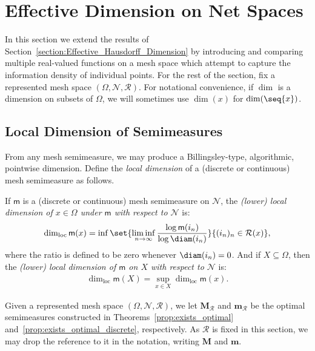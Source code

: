 
\section{Effective Dimension on Net Spaces}
\label{section:Effective_Dimension_on_Net_Spaces}

In this section we extend the results of Section~\ref{section:Effective_Hausdorff_Dimension} by introducing and comparing multiple real-valued functions on a mesh space which attempt to capture the information density of individual points. For the rest of the section, fix a represented mesh space $(\Omega, \mathcal{N}, \mathscr{R})$. For notational convenience, if $\dim$ is a dimension on subsets of $\Omega$, we will sometimes use $\dim(x)$ for $\dim(\seq{x})$. 

\subsection{Local Dimension of Semimeasures}

From any mesh semimeasure, we may produce a Billingsley-type, algorithmic, pointwise dimension. Define the \textit{local dimension} of a (discrete or continuous) mesh semimeasure as follows.

\begin{definition}
    If $\mathsf{m}$ is a (discrete or continuous) mesh semimeasure on $\mathcal{N}$, the \textit{(lower) local dimension of $x \in \Omega$ under $\mathsf{m}$ with respect to $\mathcal{N}$} is:
    \begin{align*}
        \dim_{\operatorname{loc}} \mathsf{m}(x) = \inf \set{\liminf_{n \to \infty} \frac{\log \mathsf{m}(i_n)}{\log \diam(i_n)}}{(i_n)_n \in \mathcal{R}(x)},
    \end{align*}
    where the ratio is defined to be zero whenever $\diam(i_n) = 0$. And if $X \subseteq \Omega$, then the \textit{(lower) local dimension of $\mathsf{m}$ on $X$ with respect to $\mathcal{N}$} is:
    \begin{align*}
        \dim_{\operatorname{loc}} \mathsf{m}(X) = \sup_{x \in X} \dim_{\operatorname{loc}} \mathsf{m}(x).
    \end{align*}
\end{definition}

Given a represented mesh space $(\Omega, \mathcal{N}, \mathscr{R})$, we let $\mathbf{M}_{\mathscr{R}}$ and $\mathbf{m}_{\mathscr{R}}$ be the optimal semimeasures constructed in Theorems~\ref{prop:exists_optimal} and~\ref{prop:exists_optimal_discrete}, respectively. As $\mathscr{R}$ is fixed in this section, we may drop the reference to it in the notation, writing $\mathbf{M}$ and $\mathbf{m}$.

